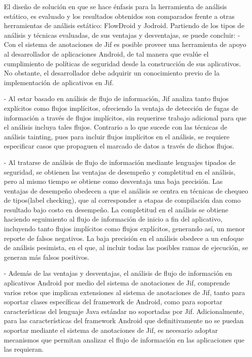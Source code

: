 El diseño de solución en que se hace énfasis para la herramienta de análisis
estático, es evaluado y los resultados obtenidos son comparados frente a otras
herramientas de análisis estático: FlowDroid y Jodroid. Partiendo de los tipos
de análisis y técnicas evaluadas, de sus ventajas y desventajas, se
puede concluir:\newline 
- Con el sistema de anotaciones de Jif es posible proveer una
herramienta de apoyo al desarrollador de aplicaciones Android, de tal manera que evalúe el
cumplimiento de políticas de seguridad desde la construcción de sus aplicativos.\\
No obstante, el desarrollador debe adquirir un conocimiento previo de la
implementación de aplicativos en Jif.

- Al estar basado en análisis de flujo de información, Jif analiza tanto flujos
explícitos como flujos implícitos, ofreciendo la ventaja de detección de fugas
de información a través de flujos implícitos, sin requerirse trabajo adicional
para que el análisis incluya tales flujos. Contrario a lo que sucede con las
técnicas de análisis tainting, pues para incluir flujos implícitos en el
análisis, se requiere especificar casos que propaguen el marcado de datos a
través de dichos flujos.

- Al tratarse de análisis de flujo de información mediante lenguajes tipados de
seguridad, se obtienen las ventajas de desempeño y completitud en el análisis,
pero al mismo tiempo se obtiene como desventaja una baja precisión.\newline 
Las ventajas de desempeño obedecen a que el análisis se centra en técnicas de
chequeo de tipos(label checking), que al corresponder a etapas de compilación
dan como resultado bajo costo en desempeño.\newline
La completitud en el análisis se obtiene  haciendo seguimiento al flujo de
información de inicio a fin del aplicativo\cite{LanguageIFS-2013}, incluyendo
tanto flujos implícitos como flujos explícitos, generando así, un menor 
reporte de falsos negativos.\newline 
La baja precisión en el análisis obedece a
un enfoque de análisis pesimista, en el que, al incluir todas las posibles ramas de ejecución, se generan más
falsos positivos.

- Además de las ventajas y desventajas, el análisis de flujo de información en
aplicativos Android por medio del sistema de anotaciones de Jif,
comprende varios retos que implican extensiones al sistema de anotaciones de
Jif, tanto para soportar clases específicas del framework de Android, como para
soportar características del lenguaje Java estándar no soportadas por Jif.\newline 
Adicionalmente, para las características del framework Android que
definitivamente no se puedan soportar mediante el sistema de anotaciones de Jif,
es necesario adoptar mecanismos que permitan analizar el flujo de información en
las aplicaciones que las requieran.

